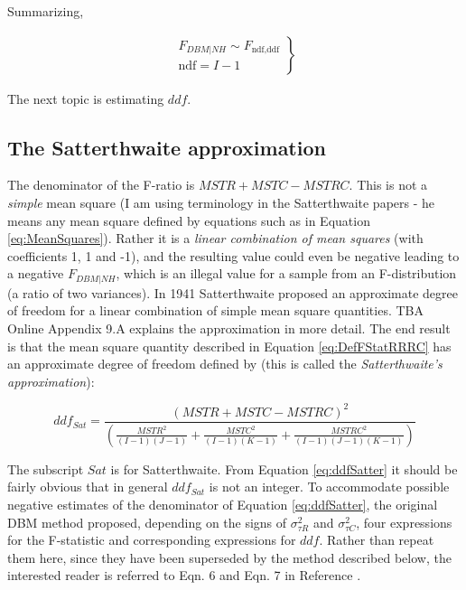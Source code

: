 \documentclass[
]{book}
\begin{document}
Summarizing,

\begin{align}
\left.\begin{array}{rll}
F_{DBM|NH} \sim F_{\text{ndf},\text{ddf}} \\
\text{ndf}=I-1
\end{array}\right\}
\label{eq:NhDistrDBMDefFStatRRRC}
\end{align}

The next topic is estimating \(ddf\).

\hypertarget{the-satterthwaite-approximation}{%
\subsection{The Satterthwaite approximation}\label{the-satterthwaite-approximation}}

The denominator of the F-ratio is \(MSTR+MSTC-MSTRC\). This is not a \emph{simple} mean square (I am using terminology in the Satterthwaite papers - he means any mean square defined by equations such as in Equation \eqref{eq:MeanSquares}). Rather it is a \emph{linear combination of mean squares} (with coefficients 1, 1 and -1), and the resulting value could even be negative leading to a negative \(F_{DBM|NH}\), which is an illegal value for a sample from an F-distribution (a ratio of two variances). In 1941 Satterthwaite \citep{RN2359, RN2360} proposed an approximate degree of freedom for a linear combination of simple mean square quantities. TBA Online Appendix 9.A explains the approximation in more detail. The end result is that the mean square quantity described in Equation \eqref{eq:DefFStatRRRC} has an approximate degree of freedom defined by (this is called the \emph{Satterthwaite's approximation}):

\begin{equation}
ddf_{Sat}=\frac{\left ( MSTR + MSTC - MSTRC \right )^2}{\left ( \frac{MSTR^2}{(I-1)(J-1)} + \frac{MSTC^2}{(I-1)(K-1)} + \frac{MSTRC^2}{(I-1)(J-1)(K-1)}  \right )}
\label{eq:ddfSatter}
\end{equation}

The subscript \(Sat\) is for Satterthwaite. From Equation \eqref{eq:ddfSatter} it should be fairly obvious that in general \(ddf_{Sat}\) is not an integer. To accommodate possible negative estimates of the denominator of Equation \eqref{eq:ddfSatter}, the original DBM method \citep{RN204} proposed, depending on the signs of \(\sigma_{\tau R}^2\) and \(\sigma_{\tau C}^2\), four expressions for the F-statistic and corresponding expressions for \(ddf\). Rather than repeat them here, since they have been superseded by the method described below, the interested reader is referred to Eqn. 6 and Eqn. 7 in Reference \citep{RN1866}.
\end{document}
